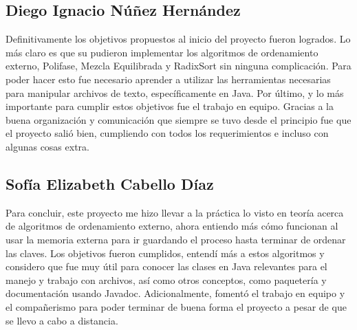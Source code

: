 \documentclass[11pt]{article}
\begin{document}
\subsection{Diego Ignacio Núñez Hernández}
Definitivamente los objetivos propuestos al inicio del proyecto fueron logrados. 
Lo más claro es que su pudieron implementar los algoritmos de ordenamiento externo, Polifase, Mezcla Equilibrada y RadixSort sin ninguna complicación. Para poder hacer esto fue necesario aprender a utilizar las herramientas necesarias para manipular archivos de texto, específicamente en Java. Por último, y lo más importante para cumplir estos objetivos fue el trabajo en equipo. Gracias a la buena organización y comunicación que siempre se tuvo desde el principio fue que el proyecto salió bien, cumpliendo con todos los requerimientos e incluso con algunas cosas extra.

\subsection{Sofía Elizabeth Cabello Díaz}
Para concluir, este proyecto me hizo llevar a la práctica lo visto en teoría acerca de algoritmos de ordenamiento externo, ahora entiendo más cómo funcionan al usar la memoria externa para ir guardando el proceso hasta terminar de ordenar las claves. Los objetivos fueron cumplidos, entendí más a estos algoritmos y considero que fue muy útil para conocer las clases en Java relevantes para el manejo y trabajo con archivos, así como otros conceptos, como paquetería y documentación usando Javadoc. Adicionalmente, fomentó el trabajo en equipo y el compañerismo para poder terminar de buena forma el proyecto a pesar de que se llevo a cabo a distancia. 
\end{document}
